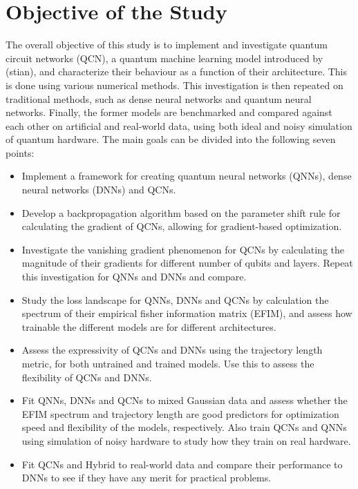 \section{Objective of the Study}
The overall objective of this study is to implement and investigate quantum circuit networks (QCN), a quantum machine learning model introduced by (stian), and characterize their behaviour as a function of their architecture. This is done using various numerical methods. This investigation is then repeated on traditional methods, such as dense neural networks and quantum neural networks. Finally, the former models are benchmarked and compared against each other on artificial and real-world data, using both ideal and noisy simulation of quantum hardware. The main goals can be divided into the following seven points:

\begin{itemize}
    \item Implement a framework for creating quantum neural networks (QNNs), dense neural networks (DNNs) and QCNs.
    
    \item Develop a backpropagation algorithm based on the parameter shift rule for calculating the gradient of QCNs, allowing for gradient-based optimization. 
    
    \item Investigate the vanishing gradient phenomenon for QCNs by calculating the magnitude of their gradients for different number of qubits and layers. Repeat this investigation for QNNs and DNNs and compare.
    
    \item Study the loss landscape for QNNs, DNNs and QCNs by calculation the spectrum of their empirical fisher information matrix (EFIM), and assess how trainable the different models are for different architectures.
    
    \item Assess the expressivity of QCNs and DNNs using the trajectory length metric, for both untrained and trained models. Use this to assess the flexibility of QCNs and DNNs. 
    
    \item Fit QNNs, DNNs and QCNs to mixed Gaussian data and assess whether the EFIM spectrum and trajectory length are good predictors for optimization speed and flexibility of the models, respectively. Also train QCNs and QNNs using simulation of noisy hardware to study how they train on real hardware.
    
    \item Fit QCNs and Hybrid to real-world data and compare their performance to DNNs to see if they have any merit for practical problems. 
\end{itemize}